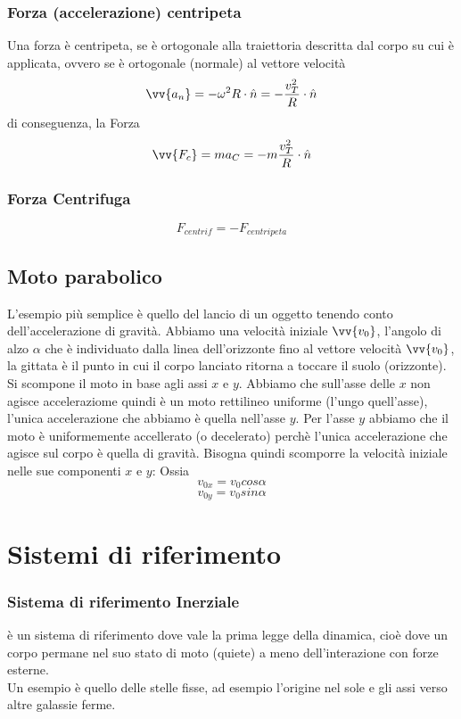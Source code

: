 \documentclass[a4paper]{report}
\begin{document}
  \subsection{Forza (accelerazione) centripeta}
  Una forza è centripeta, se è ortogonale alla traiettoria descritta dal corpo su cui è applicata, ovvero se è ortogonale (normale) al vettore velocità
  $$ \vv{a_n} = -\omega^2 R \cdot \hat{n} = -\frac{v_T^2}{R} \cdot \hat{n} $$
  di conseguenza, la Forza
  $$ \vv{F_c} = ma_C =  -m\frac{v_T^2}{R} \cdot \hat{n}$$

  \subsection{Forza Centrifuga}
  $$ F_{centrif} = - F_{centripeta} $$


  \section{Moto parabolico}
  L'esempio più semplice è quello del lancio di un oggetto tenendo conto dell'accelerazione di gravità. Abbiamo una velocità iniziale $\vv{v_0}$, l'angolo di alzo $\alpha$ che è individuato dalla linea dell'orizzonte fino al vettore velocità $\vv{v_0}$, la gittata è il punto in cui il corpo lanciato ritorna a toccare il suolo (orizzonte).\\
  Si scompone il moto in base agli assi $x$ e $y$. Abbiamo che sull'asse delle $x$ non agisce acceleraziome quindi è un moto rettilineo uniforme (l'ungo quell'asse), l'unica accelerazione che abbiamo è quella nell'asse $y$.
  Per l'asse $y$ abbiamo che il moto è uniformemente accellerato (o decelerato) perchè l'unica accelerazione che agisce sul corpo è quella di gravità.
  Bisogna quindi scomporre la velocità iniziale nelle sue componenti $x$ e $y$: Ossia
  $$v_{0x} = v_0 cos\alpha$$
  $$v_{0y} = v_0 sin\alpha$$


  \chapter{Sistemi di riferimento}
  \subsection{Sistema di riferimento Inerziale}
  è un sistema di riferimento dove vale la prima legge della dinamica, cioè dove un corpo permane nel suo stato di moto (quiete) a meno dell'interazione con forze esterne.\\
  Un esempio è quello delle stelle fisse, ad esempio l'origine nel sole e gli assi verso altre galassie ferme.
\end{document}
